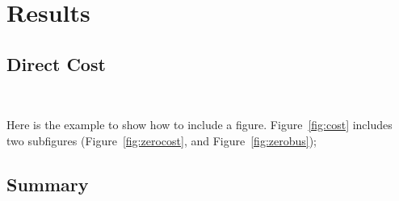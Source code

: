 \chapter{Results}
\label{cha:result}

\section{Direct Cost}\
\label{sec:direct_cost}

Here is the example to show how to include a figure. Figure~\ref{fig:cost}
includes two subfigures (Figure~\ref{fig:zerocost}, and Figure~\ref{fig:zerobus});

\begin{figure*}
  \label{fig:cost}
  \caption{The cost of zero initialization}
\end{figure*}


\section{Summary}
